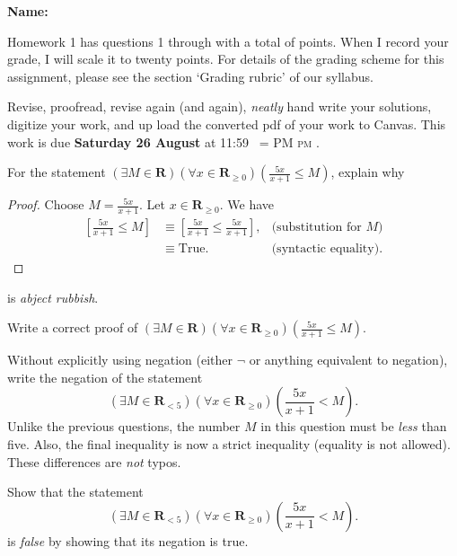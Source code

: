 \documentclass[12pt,fleqn,answers]{exam}
\makeatletter
\newcommand{\reals}{\mathbf{R}}
\newcommand{\quiz}{1}
\newcommand{\term}{Fall}
\DeclareRobustCommand{\maybefakesc}[1]{%
  \ifnum\pdfstrcmp{\f@series}{\bfdefault}=\z@
    {\fontsize{\dimexpr0.8\dimexpr\f@size pt\relax}{0}\selectfont\uppercase{#1}}%
  \else
    \textsc{#1}%
  \fi
}
\newcommand\PM{\,\maybefakesc{pm}\xspace}
\makeatother
\begin{document}
\large
\vspace{0.1in}
\noindent{}
{\bf Name:}  \\
\noindent \makebox[3.0truein][l]{\textbf{Homework \quiz, \term \/ \the\year}}
\vspace{0.1in}

\noindent  Homework \quiz\/  has questions 1 through  \numquestions \/ with a total 
of  \numpoints\/  points. When I record your grade, I will scale it to twenty points. 
For details of the grading scheme for this assignment, please see the section 
`Grading rubric' of our syllabus.

Revise, proofread, revise again (and again), \emph{neatly} 
hand write your solutions, digitize your work, and 
up load the converted pdf of your work to Canvas.  
This work is due \textbf{Saturday 26 August} at 11:59 \PM.

\vspace{0.1in}




\begin{questions}

\question[10] For the statement  \(\left(\exists M \in \reals  \right)
\left(\forall x \in \reals_{\geq 0} \right) \left(\frac{5 x}{x+1} \leq M \right)\), explain why

\begin{proof} Choose $M = \frac{5 x}{x+1}$. Let  $x \in \reals_{\geq 0}$. We have
\begin{align*}
 \left[\frac{5 x}{x+1} \leq M  \right] &\equiv
 \left[\frac{5 x}{x+1} \leq  \frac{5 x}{x+1}  \right],  &\mbox{(substitution for $M$)} \\
 &\equiv \mbox{True}. &\mbox{(syntactic equality)}. 
\end{align*}
\end{proof}
is \emph{abject rubbish}.

\question[10] Write a correct proof of \(\left(\exists M \in \reals\right)
\left(\forall x \in \reals_{\geq 0} \right) \left(\frac{5 x}{x+1} \leq  M \right)\).

\question [10]  Without explicitly using negation (either $\lnot$ or anything equivalent to negation), write the negation of the statement
\begin{equation*}
\left(\exists M \in  \reals_{< 5} \right)
\left(\forall x \in  \reals_{\geq 0} \right) \left(\frac{5 x}{x+1} <  M \right).
\end{equation*}
Unlike the previous questions, the number $M$ in this question must be \emph{less} than five. Also,
the final inequality is now a strict inequality (equality is not allowed). These differences are \emph{not} typos.

\question [10]  Show that the statement 
\begin{equation*}
\left(\exists M \in  \reals_{< 5} \right)
\left(\forall x \in  \reals_{\geq 0} \right) \left(\frac{5 x}{x+1}  < M \right).
\end{equation*}
is \emph{false} by showing that its negation is true.


 
\end{questions}
\end{document}
